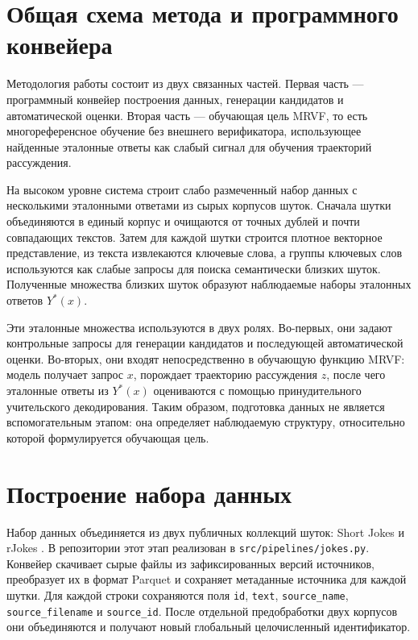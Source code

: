 \section{Общая схема метода и программного конвейера}

Методология работы состоит из двух связанных частей. Первая часть --- программный конвейер построения данных, генерации кандидатов и автоматической оценки. Вторая часть --- обучающая цель MRVF, то есть многореференсное обучение без внешнего верификатора, использующее найденные эталонные ответы как слабый сигнал для обучения траекторий рассуждения.

На высоком уровне система строит слабо размеченный набор данных с несколькими эталонными ответами из сырых корпусов шуток. Сначала шутки объединяются в единый корпус и очищаются от точных дублей и почти совпадающих текстов. Затем для каждой шутки строится плотное векторное представление, из текста извлекаются ключевые слова, а группы ключевых слов используются как слабые запросы для поиска семантически близких шуток. Полученные множества близких шуток образуют наблюдаемые наборы эталонных ответов \(Y^{*}(x)\).

Эти эталонные множества используются в двух ролях. Во-первых, они задают контрольные запросы для генерации кандидатов и последующей автоматической оценки. Во-вторых, они входят непосредственно в обучающую функцию MRVF: модель получает запрос \(x\), порождает траекторию рассуждения \(z\), после чего эталонные ответы из \(Y^{*}(x)\) оцениваются с помощью принудительного учительского декодирования. Таким образом, подготовка данных не является вспомогательным этапом: она определяет наблюдаемую структуру, относительно которой формулируется обучающая цель.

\section{Построение набора данных}

Набор данных объединяется из двух публичных коллекций шуток: Short Jokes и rJokes \citep{weller2020rjokes}. В репозитории этот этап реализован в \texttt{src/pipelines/jokes.py}. Конвейер скачивает сырые файлы из зафиксированных версий источников, преобразует их в формат Parquet и сохраняет метаданные источника для каждой шутки. Для каждой строки сохраняются поля \texttt{id}, \texttt{text}, \texttt{source\_name}, \texttt{source\_filename} и \texttt{source\_id}. После отдельной предобработки двух корпусов они объединяются и получают новый глобальный целочисленный идентификатор.

